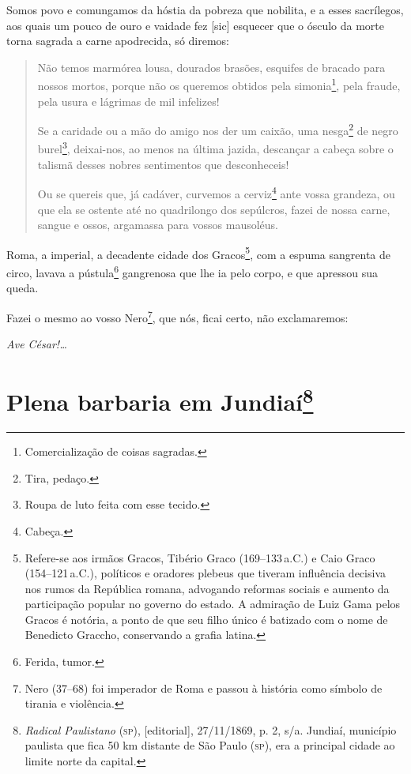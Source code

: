 Somos povo e comungamos da hóstia da pobreza que nobilita, e a esses
sacrílegos, aos quais um pouco de ouro e vaidade fez {[}sic{]} esquecer
que o ósculo da morte torna sagrada a carne apodrecida, só diremos:

\begin{quote}
Não temos marmórea lousa, dourados brasões, esquifes de bracado para
nossos mortos, porque não os queremos obtidos pela simonia\footnote{
  Comercialização de coisas sagradas.}, pela fraude, pela usura e
lágrimas de mil infelizes!

Se a caridade ou a mão do amigo nos der um caixão, uma nesga\footnote{
  Tira, pedaço.} de negro burel\footnote{Roupa de luto feita com esse
  tecido.}, deixai-nos, ao menos na última jazida, descançar a cabeça
sobre o talismã desses nobres sentimentos que desconheceis!

Ou se quereis que, já cadáver, curvemos a cerviz\footnote{Cabeça.}
ante vossa grandeza, ou que ela se ostente até no quadrilongo dos
sepúlcros, fazei de nossa carne, sangue e ossos, argamassa para vossos
mausoléus.
\end{quote}

\noindent\dotfill

Roma, a imperial, a decadente cidade dos Gracos\footnote{Refere-se aos
  irmãos Gracos, Tibério Graco (169--133\,a.C.) e Caio Graco (154--121\,a.C.), 
  políticos e oradores plebeus que tiveram influência
  decisiva nos rumos da República romana, advogando reformas sociais e
  aumento da participação popular no governo do estado. A admiração de
  Luiz Gama pelos Gracos é notória, a ponto de que seu filho único é
  batizado com o nome de Benedicto Graccho, conservando a grafia latina.\label{graco}},
com a espuma sangrenta de circo, lavava a pústula\footnote{Ferida,
  tumor.} gangrenosa que lhe ia pelo corpo, e que apressou sua queda.

Fazei o mesmo ao vosso Nero\footnote{Nero (37--68) foi imperador de
  Roma e passou à história como símbolo de tirania e violência.}, que
nós, ficai certo, não exclamaremos:

\emph{Ave César!\ldots{}}

\chapter{Plena barbaria em Jundiaí\footnote{\emph{Radical Paulistano}
  (\textsc{sp}), {[}editorial{]}, 27/11/1869, p. 2, s/a. Jundiaí, município
  paulista que fica 50 km distante de São Paulo (\textsc{sp}), era a principal
  cidade ao limite norte da capital.}}

